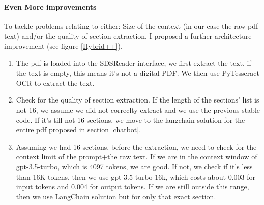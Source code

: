 \documentclass[a4paper,12pt,twoside]{report}
\begin{document}
\paragraph{Even More improvements}
To tackle problems relating to either: Size of the context (in our case the raw pdf text) and/or the quality of section extraction, I proposed a further architecture improvement (see figure \ref{Hybrid++}).
\begin{enumerate}
\item The pdf is loaded into the SDSReader interface, we first extract the text, if the text is empty, this means it's not a digital PDF. We then use PyTesseract OCR to extract the text.
\item Check for the quality of section extraction. If the length of the sections' list is not 16, we assume we did not correclty extract and we use the previous stable code. If it's till not 16 sections, we move to the langchain solution for the entire pdf proposed in section \ref{chatbot}.
\item Assuming we had 16 sections, before the extraction, we need to check for the context limit of the prompt+the raw text. If we are in the context window of gpt-3.5-turbo, which is 4097 tokens, we are good. If not, we check if it's less than 16K tokens, then we use gpt-3.5-turbo-16k, which costs about 0.003 for input tokens and 0.004 for output tokens. If we are still outside this range, then we use LangChain solution but for only that exact section.
\end{enumerate}
\end{document}
